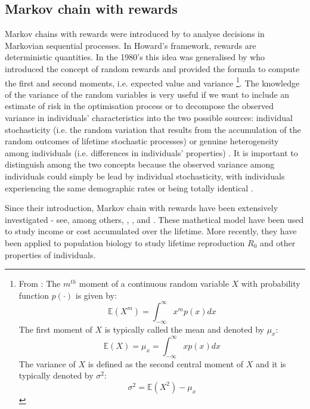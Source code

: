 \documentclass[\main/main.tex]{subfiles}
\begin{document}
\subsection{Markov chain with rewards}

Markov chains with rewards were introduced by \cite{Howard1960} to analyse decisions in Markovian sequential processes. In Howard's framework, rewards are deterministic quantities. In the 1980's this idea was generalised by \cite{Benito1982} who introduced the concept of random rewards and provided the formula to compute the first and second moments, i.e. expected value and variance \footnote{ From \cite{Karlin1975}: The $m^{th}$ moment of a continuous random variable $X$ with probability function $p(\cdot)$ is given by:
\begin{equation}
    \mathds{E}(X^m) = \int_{-\infty}^{\infty} x^m p(x) dx
\end{equation}
The first moment of $X$ is typically called the mean and denoted by $\mu_x$:
\begin{equation}
    \mathds{E}(X) = \mu_x = \int_{-\infty}^{\infty} x p(x) dx
\end{equation}
The variance of $X$ is defined as the second central moment of $X$ and it is typically denoted by $\sigma^2$:
\begin{equation}
    \sigma^2 = \mathds{E}(X^2) - \mu_x
\end{equation}
}.
The knowledge of the variance of the random variables is very useful if we want to include an estimate of risk in the optimisation process \citep{Benito1982} or to decompose the observed variance in individuals' characteristics into the two possible sources: individual stochasticity (i.e. the random variation that results from the accumulation of the random outcomes of lifetime stochastic processes) or genuine heterogeneity among individuals (i.e. differences in individuals' properties) \citep{Hartemink2017a, Caswell2011}.
It is important to distinguish among the two concepts because the observed variance among individuals could simply be lead by individual stochasticity, with individuals experiencing the same demographic rates or being totally identical \citep{VanDaalen2017}.



Since their introduction, Markov chain with rewards have been extensively investigated - see, among others, \cite{Howard1960}, \cite{Puterman1994}, and \cite{Sheskin2010}. These mathetical model have been used to study income or cost accumulated over the lifetime. More recently, they have been applied to population biology to study lifetime reproduction $R_0$ \citep{Caswell2011, VanDaalen2015, VanDaalen2017} and other properties of individuals. 
\end{document}

